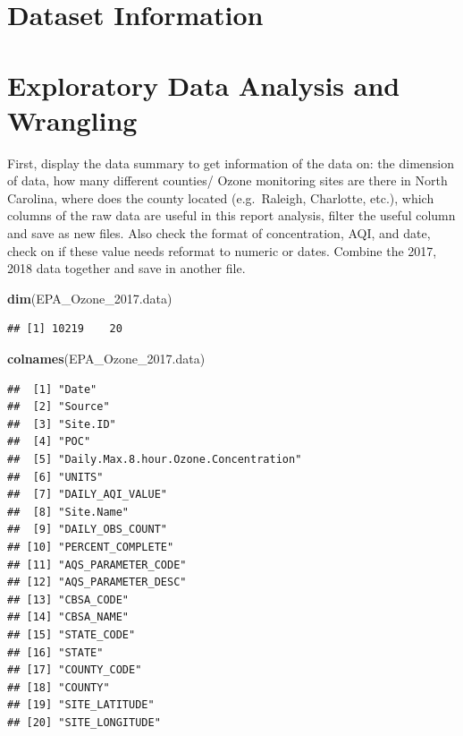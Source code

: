 \documentclass[12pt,]{article}
\newenvironment{Shaded}{\begin{snugshade}}{\end{snugshade}}
\newcommand{\KeywordTok}[1]{\textcolor[rgb]{0.13,0.29,0.53}{\textbf{#1}}}
\newcommand{\FloatTok}[1]{\textcolor[rgb]{0.00,0.00,0.81}{#1}}
\newcommand{\NormalTok}[1]{#1}
\begin{document}
\newpage

\section{Dataset Information}\label{dataset-information}

\newpage

\section{Exploratory Data Analysis and
Wrangling}\label{exploratory-data-analysis-and-wrangling}

 First, display the data summary to get information of the data on: the
dimension of data, how many different counties/ Ozone monitoring sites
are there in North Carolina, where does the county located
(e.g.~Raleigh, Charlotte, etc.), which columns of the raw data are
useful in this report analysis, filter the useful column and save as new
files. Also check the format of concentration, AQI, and date, check on
if these value needs reformat to numeric or dates. Combine the 2017,
2018 data together and save in another file.

\begin{Shaded}
\begin{Highlighting}[]
\KeywordTok{dim}\NormalTok{(EPA_Ozone_}\FloatTok{2017.}\NormalTok{data)}
\end{Highlighting}
\end{Shaded}

\begin{verbatim}
## [1] 10219    20
\end{verbatim}

\begin{Shaded}
\begin{Highlighting}[]
\KeywordTok{colnames}\NormalTok{(EPA_Ozone_}\FloatTok{2017.}\NormalTok{data)}
\end{Highlighting}
\end{Shaded}

\begin{verbatim}
##  [1] "Date"                                
##  [2] "Source"                              
##  [3] "Site.ID"                             
##  [4] "POC"                                 
##  [5] "Daily.Max.8.hour.Ozone.Concentration"
##  [6] "UNITS"                               
##  [7] "DAILY_AQI_VALUE"                     
##  [8] "Site.Name"                           
##  [9] "DAILY_OBS_COUNT"                     
## [10] "PERCENT_COMPLETE"                    
## [11] "AQS_PARAMETER_CODE"                  
## [12] "AQS_PARAMETER_DESC"                  
## [13] "CBSA_CODE"                           
## [14] "CBSA_NAME"                           
## [15] "STATE_CODE"                          
## [16] "STATE"                               
## [17] "COUNTY_CODE"                         
## [18] "COUNTY"                              
## [19] "SITE_LATITUDE"                       
## [20] "SITE_LONGITUDE"
\end{verbatim}
\end{document}
